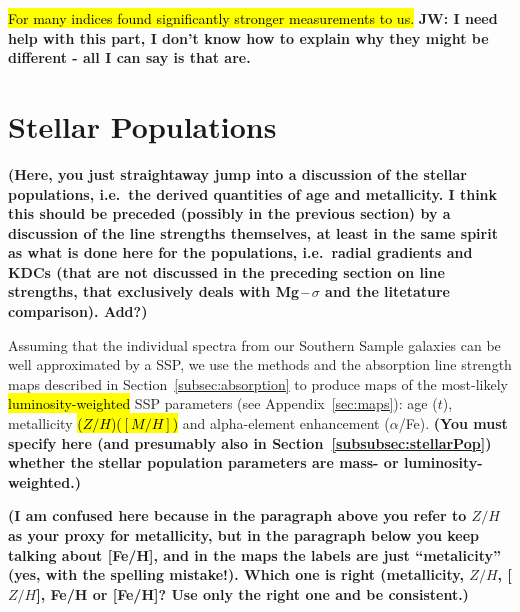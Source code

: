 \documentclass[a4paper,fleqn,usenatbib]{mnras}
\DeclareRobustCommand{\removed}[1]{{\sethlcolor{red}\hl{#1}}}
\DeclareRobustCommand{\added}[1]{{\sethlcolor{green}\hl{#1}}}
\begin{document}
\added{For many indices \citet{Ogando2008} found significantly stronger measurements to us.} {\bf JW: I need help with this part, I don't know how to explain why they might be different - all I can say is that are.}

\section{Stellar Populations}
\label{sec:stellarPop}

{\bf (Here, you just straightaway jump into a discussion of the
  stellar populations, i.e.\ the derived quantities of age and
  metallicity. I think this should be preceded (possibly in the
  previous section) by a discussion of the line strengths themselves,
  at least in the same spirit as what is done here for the
  populations, i.e.\ radial gradients and KDCs (that are not discussed
  in the preceding section on line strengths, that exclusively deals
  with Mg\,--\,$\sigma$ and the litetature comparison). Add?)}

Assuming that the individual spectra from our Southern Sample galaxies
can be well approximated by a SSP, we use the methods and the
absorption line strength maps described in
Section~\ref{subsec:absorption} to produce maps of the most-likely \added{luminosity-weighted} SSP
parameters (see Appendix~\ref{sec:maps}): age ($t$), metallicity
\removed{($Z/H$)}\added{($[M/H]$)} and alpha-element enhancement ($\alpha$/Fe). {\bf (You must
  specify here (and presumably also in
  Section~\ref{subsubsec:stellarPop}) whether the stellar population
  parameters are mass- or luminosity-weighted.)}

{\bf (I am confused here because in the paragraph above you refer to
  $Z/H$ as your proxy for metallicity, but in the paragraph below you
  keep talking about [Fe/H], and in the maps the labels are just
  ``metalicity'' (yes, with the spelling mistake!). Which one is right
  (metallicity, $Z/H$, [$Z/H$], Fe/H or [Fe/H]? Use only the right one
  and be consistent.)}
\end{document}

